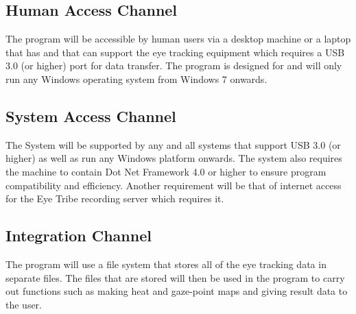 

\subsection{Human Access Channel}
    The program will be accessible by human users via a desktop machine or a laptop that has and that can support the eye tracking equipment which requires a USB 3.0 (or higher) port for data transfer. The program is designed for and will only run any Windows operating system from Windows 7 onwards.
    
\subsection{System Access Channel}
    The System will be supported by any and all systems that support USB 3.0 (or higher) as well as run any Windows platform onwards. The system also requires the machine to contain Dot Net Framework 4.0 or higher to ensure program compatibility and efficiency. Another requirement will be that of internet access for the Eye Tribe recording server which requires it.
    
\subsection{Integration Channel}
The program will use a file system that stores all of the eye tracking data in separate files. The files that are stored will then be used in the program to carry out functions such as making heat and gaze-point maps and giving result data to the user. 